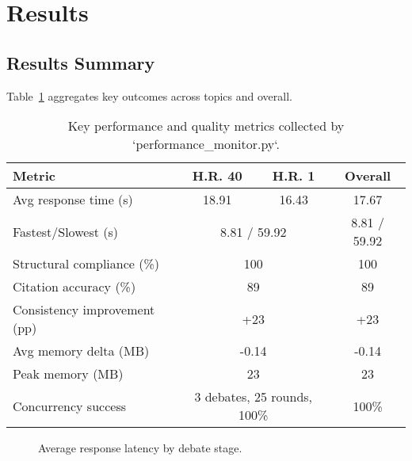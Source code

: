 \documentclass{article}
\begin{document}
\section{Results}

\subsection{Results Summary}

Table~\ref{tab:summary} aggregates key outcomes across topics and overall.

\begin{table}[t]
\centering
\small
\begin{tabular}{lccc}
\toprule
\textbf{Metric} & \textbf{H.R. 40} & \textbf{H.R. 1} & \textbf{Overall} \\
\midrule
Avg response time (s) & 18.91 & 16.43 & 17.67 \\
Fastest/Slowest (s) & \multicolumn{2}{c}{8.81 / 59.92} & 8.81 / 59.92 \\
Structural compliance (\%) & \multicolumn{2}{c}{100} & 100 \\
Citation accuracy (\%) & \multicolumn{2}{c}{89} & 89 \\
Consistency improvement (pp) & \multicolumn{2}{c}{+23} & +23 \\
Avg memory delta (MB) & \multicolumn{2}{c}{-0.14} & -0.14 \\
Peak memory (MB) & \multicolumn{2}{c}{23} & 23 \\
Concurrency success & \multicolumn{2}{c}{3 debates, 25 rounds, 100\%} & 100\% \\
\bottomrule
\end{tabular}
\caption{Key performance and quality metrics collected by `performance\_monitor.py`.}
\label{tab:summary}
\end{table}

\begin{figure}[t]
\centering
{}
\caption{Average response latency by debate stage.}
\label{fig:response-latency}
\end{figure}
\end{document}
